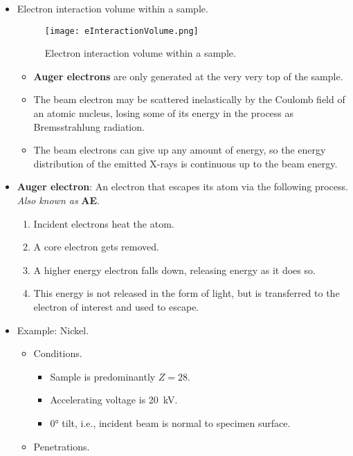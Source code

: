 \documentclass[../notes.tex]{subfiles}
\begin{document}
\begin{itemize}
\begin{itemize}
    \end{itemize}
    \item Electron interaction volume within a sample.
    \begin{figure}[H]
        \centering
        \texttt{[image: eInteractionVolume.png]}
        \caption{Electron interaction volume within a sample.}
        \label{fig:eInteractionVolume}
    \end{figure}
    \begin{itemize}
        \item \textbf{Auger electrons} are only generated at the very very top of the sample.
        \item The beam electron may be scattered inelastically by the Coulomb field of an atomic nucleus, losing some of its energy in the process as Bremsstrahlung radiation.
        \item The beam electrons can give up any amount of energy, so the energy distribution of the emitted X-rays is continuous up to the beam energy.
    \end{itemize}
    \item \textbf{Auger electron}: An electron that escapes its atom via the following process. \emph{Also known as} \textbf{AE}.
    \begin{enumerate}
        \item Incident electrons heat the atom.
        \item A core electron gets removed.
        \item A higher energy electron falls down, releasing energy as it does so.
        \item This energy is not released in the form of light, but is transferred to the electron of interest and used to escape.
    \end{enumerate}
    \item Example: Nickel.
    \begin{itemize}
        \item Conditions.
        \begin{itemize}
            \item Sample is predominantly $Z=28$.
            \item Accelerating voltage is \SI{20}{\kilo\volt}.
            \item \ang{0} tilt, i.e., incident beam is normal to specimen surface.
        \end{itemize}
        \item Penetrations.
        \begin{itemize}

\end{itemize}
\end{itemize}
\end{itemize}
\end{document}
